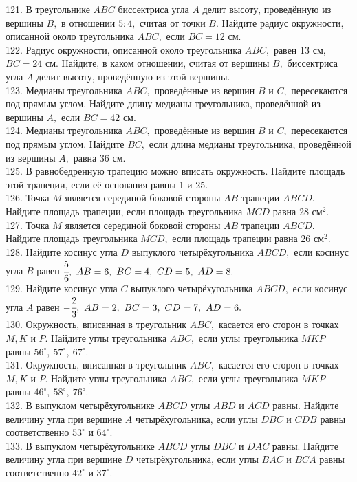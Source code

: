 \documentclass[12pt]{article}
\begin{document}
121. В треугольнике $ABC$ биссектриса угла $A$ делит высоту, проведённую из вершины $B,$ в отношении $5:4,$ считая от точки $B.$ Найдите радиус окружности, описанной около треугольника $ABC,$ если $BC=12$ см.\\
122. Радиус окружности, описанной около треугольника $ABC,$ равен 13 см, $BC=24$ см. Найдите, в каком отношении, считая от вершины $B,$ биссектриса угла $A$ делит высоту, проведённую из этой вершины.\\
123. Медианы треугольника $ABC,$ проведённые из вершин $B$ и $C,$ пересекаются под прямым углом. Найдите длину медианы треугольника, проведённой из вершины $A,$ если $BC=42$ см.\\
124. Медианы треугольника $ABC,$ проведённые из вершин $B$ и $C,$ пересекаются под прямым углом. Найдите $BC,$ если длина медианы треугольника, проведённой из вершины $A,$ равна 36 см.\\
125. В равнобедренную трапецию можно вписать окружность. Найдите площадь этой трапеции, если её основания равны 1 и 25.\\
126. Точка $M$ является серединой боковой стороны $AB$ трапеции $ABCD.$ Найдите площадь трапеции, если площадь треугольника $MCD$ равна $28\text{ см}^2.$\\
127. Точка $M$ является серединой боковой стороны $AB$ трапеции $ABCD.$ Найдите площадь треугольника $MCD,$ если площадь  трапеции равна $26\text{ см}^2.$\\
128. Найдите косинус угла $D$ выпуклого четырёхугольника $ABCD,$ если косинус угла $B$ равен $\cfrac{5}{6},\ AB=6,\ BC=4,\ CD=5,\ AD=8.$\\
129. Найдите косинус угла $C$ выпуклого четырёхугольника $ABCD,$ если косинус угла $A$ равен $-\cfrac{2}{3},\ AB=2,\ BC=3,\ CD=7,\ AD=6.$\\
130. Окружность, вписанная в треугольник $ABC,$ касается его сторон в точках $M, K$ и $P.$ Найдите углы треугольника $ABC,$ если углы треугольника $MKP$ равны $56^\circ,\ 57^\circ,\ 67^\circ.$\\
131. Окружность, вписанная в треугольник $ABC,$ касается его сторон в точках $M, K$ и $P.$ Найдите углы треугольника $ABC,$ если углы треугольника $MKP$ равны $46^\circ,\ 58^\circ,\ 76^\circ.$\\
132. В выпуклом четырёхугольнике $ABCD$ углы $ABD$ и $ACD$ равны. Найдите величину угла при вершине $A$ четырёхугольника, если углы $DBC$ и $CDB$ равны соответственно $53^\circ$ и $64^\circ.$\\
133. В выпуклом четырёхугольнике $ABCD$ углы $DBC$ и $DAC$ равны. Найдите величину угла при вершине $D$ четырёхугольника, если углы $BAC$ и $BCA$ равны соответственно $42^\circ$ и $37^\circ.$\\
\end{document}
